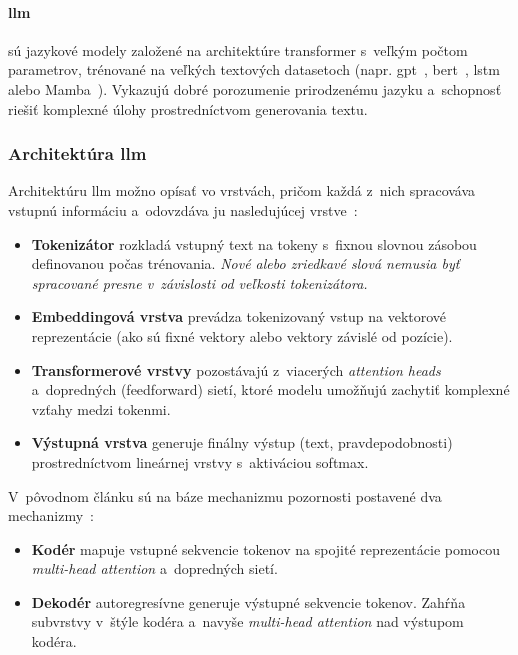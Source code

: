 \paragraph{\gls{llm}} sú jazykové modely založené na architektúre transformer s~veľkým počtom parametrov, trénované na veľkých textových datasetoch (napr. \gls{gpt}~\cite{radford2018improving}, \gls{bert}~\cite{devlin2018bert}, \gls{lstm}~\cite{hochreiter1997lstm} alebo Mamba~\cite{gu2023mamba}). Vykazujú dobré porozumenie prirodzenému jazyku a~schopnosť riešiť komplexné úlohy prostredníctvom generovania textu.

\subsubsection*{Architektúra \gls{llm}}

Architektúru \gls{llm} možno opísať vo vrstvách, pričom každá z~nich spracováva vstupnú informáciu a~odovzdáva ju nasledujúcej vrstve~\cite{mikolov2013distributed,pennington2014glove,zhao2023, attention}:

\begin{itemize}
    \item \textbf{Tokenizátor} rozkladá vstupný text na tokeny s~fixnou slovnou zásobou definovanou počas trénovania.
    \textsl{Nové alebo zriedkavé slová nemusia byť spracované presne v~závislosti od veľkosti tokenizátora.}

    \item \textbf{Embeddingová vrstva} prevádza tokenizovaný vstup na vektorové reprezentácie (ako sú fixné vektory alebo vektory závislé od pozície).

    \item \textbf{Transformerové vrstvy} pozostávajú z~viacerých \textsl{attention heads}~\cite{attention} a~dopredných (feedforward) sietí, ktoré modelu umožňujú zachytiť komplexné vzťahy medzi tokenmi.

    \item \textbf{Výstupná vrstva} generuje finálny výstup (text, pravdepodobnosti) prostredníctvom lineárnej vrstvy s~aktiváciou softmax.
\end{itemize}

V~pôvodnom článku sú na báze mechanizmu pozornosti postavené dva mechanizmy~\cite{zhao2023}:
\begin{itemize}
    \item \textbf{Kodér} mapuje vstupné sekvencie tokenov na spojité reprezentácie pomocou \textsl{multi-head attention} a~dopredných sietí.
  \item \textbf{Dekodér} autoregresívne generuje výstupné sekvencie tokenov. Zahŕňa subvrstvy v~štýle kodéra a~navyše \textsl{multi-head attention} nad výstupom kodéra.
\end{itemize}

